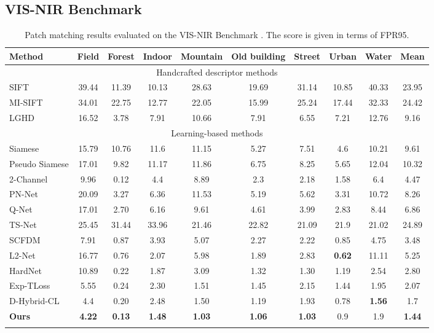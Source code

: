 \documentclass[10pt,journal]{IEEEtran}\usepackage{amsfonts}
\begin{document}
\subsection{VIS-NIR Benchmark}

\begin{table*}[tbh]
\centering
\par
\begin{tabular}{lccccccccc}
\toprule Method & Field & Forest & Indoor & Mountain & Old building & Street
& Urban & Water & Mean \\ \midrule
\multicolumn{10}{c}{Handcrafted descriptor methods}  \\ 
SIFT \cite{SIFT} & 39.44 & 11.39 & 10.13 & 28.63 & 19.69 & 31.14 & 10.85 &
40.33 & 23.95 \\
MI-SIFT \cite{MI_SIFT} & 34.01 & 22.75 & 12.77 & 22.05 & 15.99 & 25.24 &
17.44 & 32.33 & 24.42 \\
LGHD \cite{LGHD} & 16.52 & 3.78 & 7.91 & 10.66 & 7.91 & 6.55 & 7.21 & 12.76
& 9.16 \\
\midrule
\multicolumn{10}{c}{Learning-based methods} \\
Siamese \cite{SiameseCrossSpectral} & 15.79 & 10.76 & 11.6 & 11.15 & 5.27 &
7.51 & 4.6 & 10.21 & 9.61 \\
Pseudo Siamese \cite{SiameseCrossSpectral} & 17.01 & 9.82 & 11.17 & 11.86 &
6.75 & 8.25 & 5.65 & 12.04 & 10.32 \\
2-Channel \cite{SiameseCrossSpectral} & 9.96 & 0.12 & 4.4 & 8.89 & 2.3 & 2.18
& 1.58 & 6.4 & 4.47 \\
PN-Net \cite{PN_net} & 20.09 & 3.27 & 6.36 & 11.53 & 5.19 & 5.62 & 3.31 &
10.72 & 8.26 \\
Q-Net \cite{Q-net} & 17.01 & 2.70 & 6.16 & 9.61 & 4.61 & 3.99 & 2.83 & 8.44
& 6.86 \\
TS-Net \cite{TS-net} & 25.45 & 31.44 & 33.96 & 21.46 & 22.82 & 21.09 & 21.9
& 21.02 & 24.89 \\
SCFDM \cite{SCFDM} & 7.91 & 0.87 & 3.93 & 5.07 & 2.27 & 2.22 & 0.85 & 4.75 &
3.48 \\
L2-Net \cite{L2Net} & 16.77 & 0.76 & 2.07 & 5.98 & 1.89 & 2.83 & \textbf{0.62} & 11.11 & 5.25 \\
HardNet \cite{HardNet} & 10.89 & 0.22 & 1.87 & 3.09 & 1.32 & 1.30 & 1.19 &
2.54 & 2.80 \\
Exp-TLoss \cite{BetterAndFaster} & 5.55 & 0.24 & 2.30 & 1.51 & 1.45 & 2.15 &
1.44 & 1.95 & 2.07 \\
D-Hybrid-CL \cite{multisensor} & 4.4 & 0.20 & 2.48 & 1.50 & 1.19 & 1.93 &
0.78 & \textbf{1.56} & 1.7 \\
\textbf{Ours} & \textbf{4.22} & \textbf{0.13} & \textbf{1.48} & \textbf{1.03}
& \textbf{1.06} & \textbf{1.03} & 0.9 & 1.9 & \textbf{1.44} \\
\bottomrule &  &  &  &  &  &  &  &  &
\end{tabular}\caption{Patch matching results evaluated on the VIS-NIR Benchmark
\protect\cite{SiameseCrossSpectral}. The score is given in terms of FPR95.}
\label{tab:visnir}
\end{table*}
\end{document}
